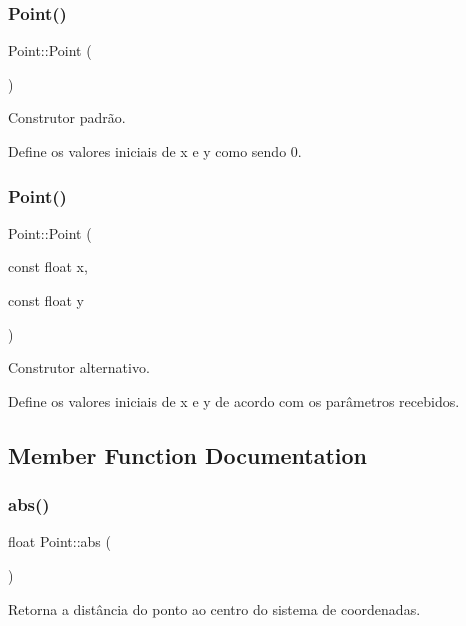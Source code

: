 \subsubsection{\texorpdfstring{Point()}{Point()}\hspace{0.1cm}{\footnotesize\ttfamily [1/2]}}
{\footnotesize\ttfamily Point\+::\+Point (\begin{DoxyParamCaption}{ }\end{DoxyParamCaption})}



Construtor padrão. 

Define os valores iniciais de x e y como sendo 0. \mbox{\label{class_point_a2bb66002bdd155f2e20ae8e1e55f5c97}} 
\subsubsection{\texorpdfstring{Point()}{Point()}\hspace{0.1cm}{\footnotesize\ttfamily [2/2]}}
{\footnotesize\ttfamily Point\+::\+Point (\begin{DoxyParamCaption}\item[{const float}]{x,  }\item[{const float}]{y }\end{DoxyParamCaption})}



Construtor alternativo. 

Define os valores iniciais de x e y de acordo com os parâmetros recebidos. 

\subsection{Member Function Documentation}
\mbox{\label{class_point_af6595756d7687bf3a324227cbbe2a531}} 
\subsubsection{\texorpdfstring{abs()}{abs()}}
{\footnotesize\ttfamily float Point\+::abs (\begin{DoxyParamCaption}{ }\end{DoxyParamCaption})}

Retorna a distância do ponto ao centro do sistema de coordenadas. \mbox{\label{class_point_a91600d1914ae912e8d9fb9da62feb1bd}} 

